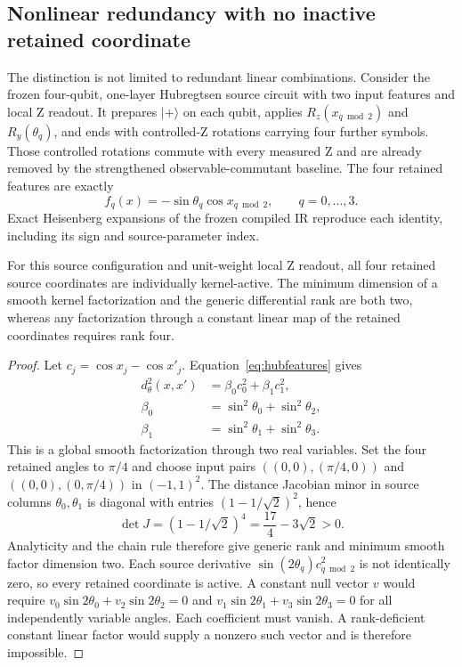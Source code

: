 \subsection{Nonlinear redundancy with no inactive retained coordinate}
\label{sec:nonlinearhub}
The distinction is not limited to redundant linear combinations.
Consider the frozen four-qubit, one-layer Hubregtsen source circuit
\cite{hubregtsen2022,squlearn}
with two input features and local Z readout. It prepares $|+\rangle$
on each qubit, applies $R_z(x_{q\bmod2})$ and $R_y(\theta_q)$,
and ends with controlled-Z rotations carrying four further symbols.
Those controlled rotations commute with every measured Z and are
already removed by the strengthened observable-commutant baseline.
The four retained features are exactly
\begin{equation}
 f_q(x)=-\sin\theta_q\cos x_{q\bmod2},\qquad q=0,\ldots,3.
 \label{eq:hubfeatures}
\end{equation}
Exact Heisenberg expansions of the frozen compiled IR reproduce
each identity, including its sign and source-parameter index.

\begin{proposition}
For this source configuration and unit-weight local Z readout,
all four retained source coordinates are individually kernel-active.
The minimum dimension of a smooth kernel factorization and the
generic differential rank are both two, whereas any factorization
through a constant linear map of the retained coordinates requires
rank four.
\end{proposition}
\begin{proof}
Let $c_j=\cos x_j-\cos x'_j$. Equation~\eqref{eq:hubfeatures} gives
\begin{align}
 d^2_\theta(x,x')&=\beta_0 c_0^2+\beta_1 c_1^2,\label{eq:hubdistance}\\
 \beta_0&=\sin^2\theta_0+\sin^2\theta_2,\nonumber\\
 \beta_1&=\sin^2\theta_1+\sin^2\theta_3.\label{eq:hubbeta}
\end{align}
This is a global smooth factorization through two real variables.
Set the four retained angles to $\pi/4$ and choose input pairs
$((0,0),(\pi/4,0))$ and $((0,0),(0,\pi/4))$ in $(-1,1)^2$.
The distance Jacobian minor in source columns $\theta_0,\theta_1$
is diagonal with entries $(1-1/\sqrt2)^2$, hence
\begin{equation}
 \det J=(1-1/\sqrt2)^4=\frac{17}{4}-3\sqrt2>0.
 \label{eq:hubminor}
\end{equation}
Analyticity and the chain rule therefore give generic rank and
minimum smooth factor dimension two. Each source derivative
$\sin(2\theta_q)c_{q\bmod2}^2$ is not identically zero, so every
retained coordinate is active. A constant null vector $v$ would
require $v_0\sin2\theta_0+v_2\sin2\theta_2=0$ and
$v_1\sin2\theta_1+v_3\sin2\theta_3=0$ for all independently
variable angles. Each coefficient must vanish. A rank-deficient
constant linear factor would supply a nonzero such vector and is
therefore impossible.
\end{proof}

